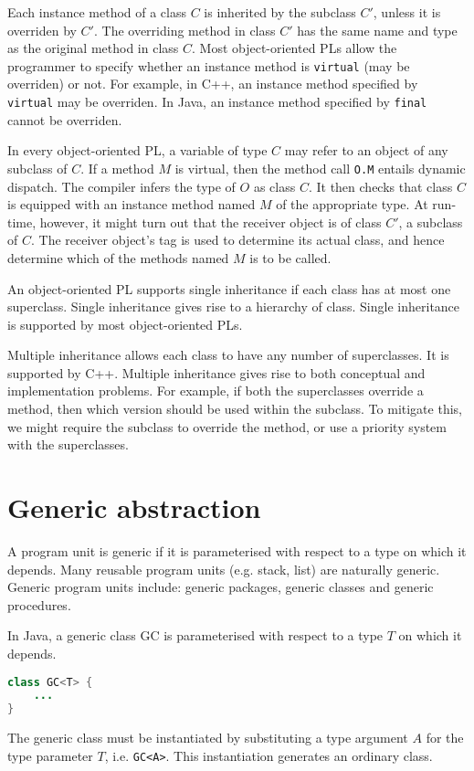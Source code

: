 \documentclass[a4paper, openany]{memoir}
\begin{document}
Each instance method of a class $C$ is inherited by the subclass $C'$, unless it is overriden by $C'$. The overriding method in class $C'$ has the same name and type as the original method in class $C$. Most object-oriented PLs allow the programmer to specify whether an instance method is \texttt{virtual} (may be overriden) or not. For example, in C++, an instance method specified by \texttt{virtual} may be overriden. In Java, an instance method specified by \texttt{final} cannot be overriden.

In every object-oriented PL, a variable of type $C$ may refer to an object of any subclass of $C$. If a method $M$ is virtual, then the method call \texttt{O.M} entails dynamic dispatch. The compiler infers the type of $O$ as class $C$. It then checks that class $C$ is equipped with an instance method named $M$ of the appropriate type. At run-time, however, it might turn out that the receiver object is of class $C'$, a subclass of $C$. The receiver object's tag is used to determine its actual class, and hence determine which of the methods named $M$ is to be called.

An object-oriented PL supports single inheritance if each class has at most one superclass. Single inheritance gives rise to a hierarchy of class. Single inheritance is supported by most object-oriented PLs. 

Multiple inheritance allows each class to have any number of superclasses. It is supported by C++. Multiple inheritance gives rise to both conceptual and implementation problems. For example, if both the superclasses override a method, then which version should be used within the subclass. To mitigate this, we might require the subclass to override the method, or use a priority system with the superclasses.
\newpage

\section{Generic abstraction}
A program unit is generic if it is parameterised with respect to a type on which it depends. Many reusable program units (e.g. stack, list) are naturally generic. Generic program units include: generic packages, generic classes and generic procedures.

In Java, a generic class GC is parameterised with respect to a type $T$ on which it depends.
\begin{lstlisting}[language=Java]
class GC<T> {
    ...
}
\end{lstlisting}
The generic class must be instantiated by substituting a type argument $A$ for the type parameter $T$, i.e. \texttt{GC<A>}. This instantiation generates an ordinary class.
\end{document}
